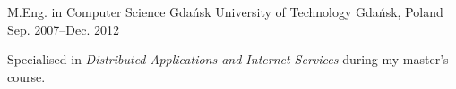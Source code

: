 
\begin{cventries}

  \cventry
    {M.Eng. in Computer Science} %
    {Gdańsk University of Technology} %
    {Gdańsk, Poland} %
    {Sep. 2007–Dec. 2012} %
    {
      \begin{cvitems} %
        \item {Specialised in \emph{Distributed Applications and Internet Services} during my master's course.}
      \end{cvitems}
    }
\end{cventries}
